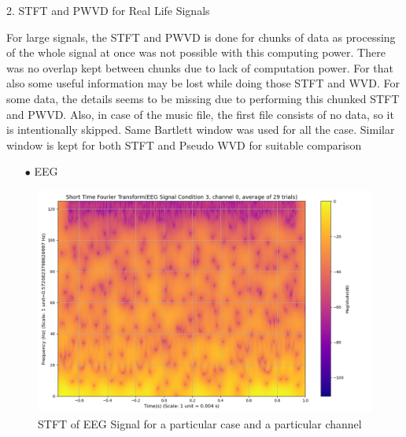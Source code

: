 \documentclass[12pt,a4paper,onecolumn]{exam}
\newcommand{\questionheader}[1]{%
  \begin{tcolorbox}[
    enhanced,
    colback=black,
    coltext=white,
    boxrule=0pt,              
    fontupper=\Large\bfseries, 
    arc=4mm                   
  ]
  #1 
  \end{tcolorbox}%
}
\begin{document}
\questionheader{2. STFT and PWVD for Real Life Signals}
\begin{solution}
  
  For large signals, the STFT and PWVD is done for chunks of data as processing of the whole signal at once was not possible with this computing power. There was no overlap kept between chunks due to lack of computation power. For that also some useful information may be lost while doing those STFT and WVD. For some data, the details seems to be missing due to performing this chunked STFT and PWVD. Also, in case of the music file, the first file consists of no data, so it is intentionally skipped. Same Bartlett window was used for all the case. Similar window is kept for both STFT and Pseudo WVD for suitable comparison

  \begin{itemize}
    \item[$\bullet$] EEG
  \end{itemize}
        \begin{figure}[H]
        \centering
        \includegraphics[scale = 0.35]{eegsignal_stft.png}
        \caption{STFT of EEG Signal for a particular case and a particular channel}
        \label{fig:29}
        \end{figure}


\end{solution}
\end{document}
